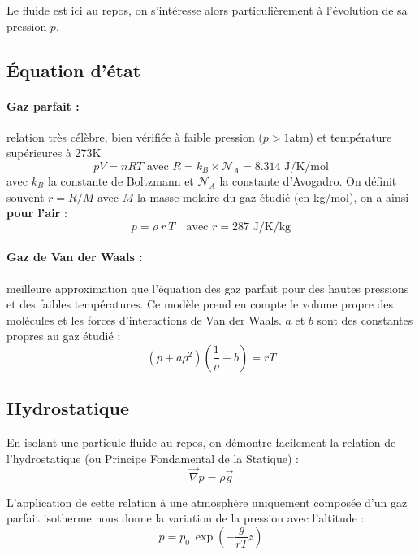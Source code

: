 
Le fluide est ici au repos, on s'intéresse alors particulièrement à l'évolution de sa pression $p$.


\subsection{Équation d'état}
\paragraph{Gaz parfait :}relation très célèbre, bien vérifiée à faible pression ($p>1$atm) et température supérieures à 273K
%
\begin{equation}
    pV = nRT
    \text{ avec } R = k_B \times \mathcal{N}_A
                    = 8.314 \text{ J/K/mol}
\end{equation}
%
avec $k_B$ la constante de Boltzmann et $\mathcal{N}_A$ la constante d'Avogadro. On définit souvent $r = R/M$ avec $M$ la masse molaire du gaz étudié (en kg/mol), on a ainsi \textbf{pour l'air} :
%
\begin{equation}
    p = \rho~r~T
    \quad\text{avec } r = 287 \text{ J/K/kg}
\end{equation}

\paragraph{Gaz de Van der Waals :}meilleure approximation que l'équation des gaz parfait pour des hautes pressions et des faibles températures. Ce modèle prend en compte le volume propre des molécules et les forces d'interactions de Van der Waals. $a$ et $b$ sont des constantes propres au gaz étudié :
%
\begin{equation}
    \left( p + a\rho^2 \right) \left( \frac{1}{\rho} - b \right) = rT
\end{equation}


\subsection{Hydrostatique}
En isolant une particule fluide au repos, on démontre facilement la relation de l'hydrostatique (ou Principe Fondamental de la Statique) :
%
\begin{equation}
    \vec{\nabla} p = \rho \vec{g}
    \label{eq:PFS}
\end{equation}

L'application de cette relation à une atmosphère uniquement composée d'un gaz parfait isotherme nous donne la variation de la pression avec l'altitude :
%
\begin{equation}
    p = p_0~\exp{\left( -\frac{g}{rT}z \right)}
\end{equation}

